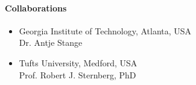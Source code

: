 \newpage
\paragraph{Collaborations}
\begin{itemize}
\item Georgia Institute of Technology, Atlanta, USA  \\ Dr. Antje Stange
\item Tufts University, Medford, USA \\ Prof. Robert J. Sternberg, PhD
\end{itemize}

\enlargethispage*{0.2cm}

\begin{bibunit}[apalike]
\nocite{*}
\putbib[profUteKunzmann3]
\end{bibunit}